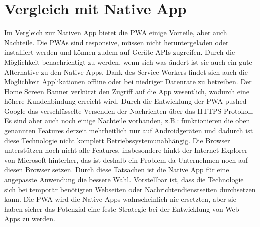 \section{Vergleich mit Native App}
Im Vergleich zur Nativen App bietet die \acl{PWA} einige Vorteile, aber auch Nachteile. Die \acs{PWA}s sind responsive, müssen nicht heruntergeladen oder\\ installiert werden und können zudem auf Geräte-APIs zugreifen. Durch die Möglichkeit benachrichtigt zu werden, wenn sich was ändert ist sie auch ein gute Alternative zu den Native Apps.
Dank des Service Workers findet sich auch die Möglichkeit Applikationen offline oder bei niedriger Datenrate zu betreiben. 
Der Home Screen Banner verkürzt den Zugriff auf die App wesentlich, wodurch eine höhere Kundenbindung erreicht wird.  
Durch die Entwicklung der \acs{PWA} pushed Google das verschlüsselte Versenden der Nachrichten über das HTTPS-Protokoll.
Es sind aber auch noch einige Nachteile vorhanden, z.B.: funktionieren die oben genannten Features derzeit mehrheitlich nur auf Androidgeräten und dadurch ist diese Technologie nicht komplett Betriebssystemunabhängig.
Die Browser unterstützen noch nicht alle Features, insbesondere hinkt der Internet Explorer von Microsoft hinterher, das ist deshalb ein Problem da Unternehmen noch auf diesen Browser setzen. 
Durch diese Tatsachen ist die Native App für eine angepasste Anwendung die bessere Wahl. 
Vorstellbar ist, dass die Technologie sich bei temporär benötigten Webseiten oder Nachrichtendienstseiten durchsetzen kann.
Die \acs{PWA} wird die Native Apps wahrscheinlich nie ersetzten, aber sie haben sicher das Potenzial eine feste Strategie bei der Entwicklung von \acs{Web-App}s zu werden.



